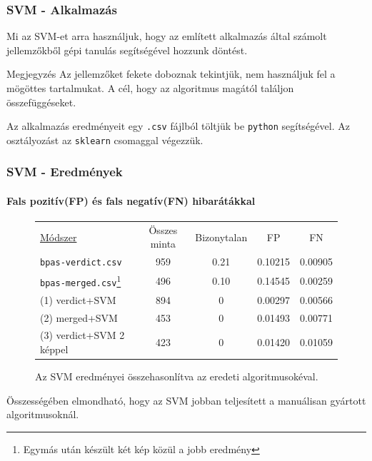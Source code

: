 \documentclass[11pt]{beamer}
\begin{document}
\begin{frame}
	\frametitle{SVM - Alkalmazás}
	
	Mi az SVM-et arra használjuk, hogy az említett alkalmazás által számolt jellemzőkből gépi tanulás segítségével hozzunk döntést.
	\begin{block}{Megjegyzés}
		Az jellemzőket fekete doboznak tekintjük, nem használjuk fel a mögöttes tartalmukat. A cél, hogy az algoritmus magától találjon összefüggéseket.
	\end{block}

	Az alkalmazás eredményeit egy \texttt{.csv} fájlból töltjük be \texttt{python} segítségével. Az osztályozást az \texttt{sklearn} csomaggal végezzük.

\end{frame}


\begin{frame}
	\frametitle{SVM - Eredmények}
	\framesubtitle{Fals pozitív(FP) és fals negatív(FN) hibarátákkal}
	
	\begin{figure}[h!]
		\centering
		\begin{tabular}{ l c c c c }
			\underline{Módszer} 		& Összes minta 	& Bizonytalan	& FP	& FN \\
			\texttt{bpas-verdict.csv} 	& 959 			& 0.21			& 0.10215 	& 0.00905 	\\
			\texttt{bpas-merged.csv}\footnote{Egymás után készült két kép közül a jobb eredmény} 	& 496			& 0.10			& 0.14545 	& 0.00259   \\
			
			\hline
			(1) verdict+SVM					& 894			& 0				& 0.00297	& 0.00566	\\
			(2) merged+SVM					& 453			& 0				& 0.01493	& 0.00771	\\
			(3) verdict+SVM 2 képpel		& 423			& 0				& 0.01420	& 0.01059   \\
			
		\end{tabular}
		
		\caption{Az SVM eredményei összehasonlítva az eredeti algoritmusokéval.}
		
	\end{figure}

	Összességében elmondható, hogy az SVM jobban teljesített a manuálisan gyártott algoritmusoknál.
	
\end{frame}
\end{document}
